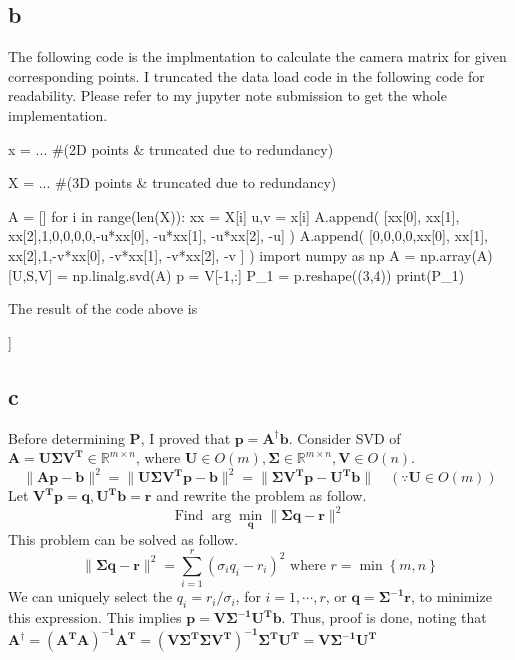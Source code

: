 \documentclass[10pt]{article}
\begin{document}
\subsection*{b} 
The following code is the implmentation to calculate the camera matrix for given corresponding points. 
I truncated the data load code in the following code for readability. Please refer to my jupyter note submission to get the whole implementation.
\begin{python}
x = ... #(2D points & truncated due to redundancy)

X = ... #(3D points & truncated due to redundancy)

A = []
for i in range(len(X)):
    xx = X[i]
    u,v = x[i]
    A.append(
        [xx[0], xx[1], xx[2],1,0,0,0,0,-u*xx[0], -u*xx[1], -u*xx[2], -u]
    )
    A.append(
        [0,0,0,0,xx[0], xx[1], xx[2],1,-v*xx[0], -v*xx[1], -v*xx[2], -v ]
    )
import numpy as np
A = np.array(A)
[U,S,V] = np.linalg.svd(A)
p = V[-1,:]
P_1 = p.reshape((3,4))
print(P_1)

\end{python}
The result of the code above is
\begin{python}
[[ 3.09963996e-03  1.46204548e-04 -4.48497465e-04 -9.78930678e-01]
 [ 3.07018252e-04  6.37193664e-04 -2.77356178e-03 -2.04144405e-01]
 [ 1.67933533e-06  2.74767684e-06 -6.83964827e-07 -1.32882928e-03]]
\end{python}

\subsection*{c}
Before determining $\mathbf{P}$, I proved that $\mathbf{p} = \mathbf{A}^\dagger \mathbf{b}$.
Consider SVD of $\mathbf{A = U\Sigma V^T} \in \mathbb{R}^{m\times n}$, where $\mathbf{U}\in O(m), \mathbf{\Sigma} \in \mathbb{R}^{m\times n}, \mathbf{V} \in O(n)$.
\begin{equation}
    \lVert \mathbf{Ap-b} \rVert^2 = \lVert \mathbf{U\Sigma V^Tp-b} \rVert^2 = \lVert \mathbf{\Sigma V^Tp - U^Tb} \rVert \quad (\because \mathbf{U}\in O(m))
\end{equation}
Let $\mathbf{V^Tp = q}, \mathbf{U^Tb = r}$ and rewrite the problem as follow.
\begin{equation}
    \text{Find } \arg\min_{\mathbf{q}} \lVert \mathbf{\Sigma q} - \mathbf{r}\rVert^2
\end{equation}
This problem can be solved as follow.
\begin{equation}
    \lVert \mathbf{\Sigma q - r}\rVert^2 = \sum_{i=1}^r (\sigma_iq_i - r_i)^2 \text{ where } r = \min \left\{m,n\right\}
\end{equation}
We can uniquely select the $q_i = r_i/\sigma_i$, for $i = 1,\cdots, r$, or $\mathbf{q = \Sigma^{-1}\mathbf{r}}$, to minimize this expression.
This implies $\mathbf{p = V\Sigma^{-1}U^Tb}$. Thus, proof is done, noting that $\mathbf{A^\dagger = (A^TA)^{-1}A^T = (V\Sigma^T\Sigma V^T)^{-1}\Sigma^TU^T = V\Sigma^{-1}U^T}$
\end{document}
